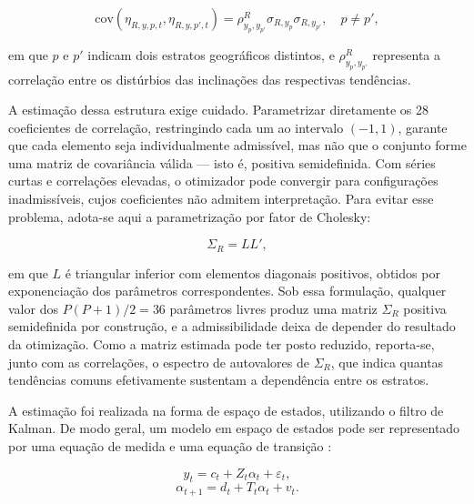 \documentclass[rbe,wwwview]{econbr}
\begin{document}
\vspace{-0.5cm}
\begin{equation}
\label{eq:covinclinacao}
    \mathrm{cov}(\eta_{R,y,p,t},\eta_{R,y,p',t}) =
    \rho^{R}_{y_p,y_{p'}}
    \sigma_{R,y_p}
    \sigma_{R,y_{p'}},
    \quad p \neq p',
\end{equation}

\noindent
em que \(p\) e \(p'\) indicam dois estratos geográficos distintos, e \(\rho^{R}_{y_p,y_{p'}}\) representa a correlação entre os distúrbios das inclinações das respectivas tendências.

A estimação dessa estrutura exige cuidado. Parametrizar diretamente os 28 coeficientes de correlação, restringindo cada um ao intervalo \((-1,1)\), garante que cada elemento seja individualmente admissível, mas não que o conjunto forme uma matriz de covariância válida --- isto é, positiva semidefinida. Com séries curtas e correlações elevadas, o otimizador pode convergir para configurações inadmissíveis, cujos coeficientes não admitem interpretação. Para evitar esse problema, adota-se aqui a parametrização por fator de Cholesky:

\vspace{-0.5cm}
\begin{equation}
    \Sigma_R = LL',
    \label{eq:cholesky}
\end{equation}

\noindent
em que \(L\) é triangular inferior com elementos diagonais positivos, obtidos por exponenciação dos parâmetros correspondentes. Sob essa formulação, qualquer valor dos \(P(P+1)/2 = 36\) parâmetros livres produz uma matriz \(\Sigma_R\) positiva semidefinida por construção, e a admissibilidade deixa de depender do resultado da otimização. Como a matriz estimada pode ter posto reduzido, reporta-se, junto com as correlações, o espectro de autovalores de \(\Sigma_R\), que indica quantas tendências comuns efetivamente sustentam a dependência entre os estratos.

A estimação foi realizada na forma de espaço de estados, utilizando o filtro de Kalman. De modo geral, um modelo em espaço de estados pode ser representado por uma equação de medida e uma equação de transição \citep{harvey1989,durbinkoop2012}:

\vspace{-0.5cm}
\begin{equation}
    y_t = c_t + Z_t\alpha_t + \varepsilon_t,
    \label{eq:medida}
\end{equation}
\vspace{-0.8cm}
\begin{equation}
    \alpha_{t+1} = d_t + T_t\alpha_t + v_t.
    \label{eq:transicao}
\end{equation}
\end{document}
